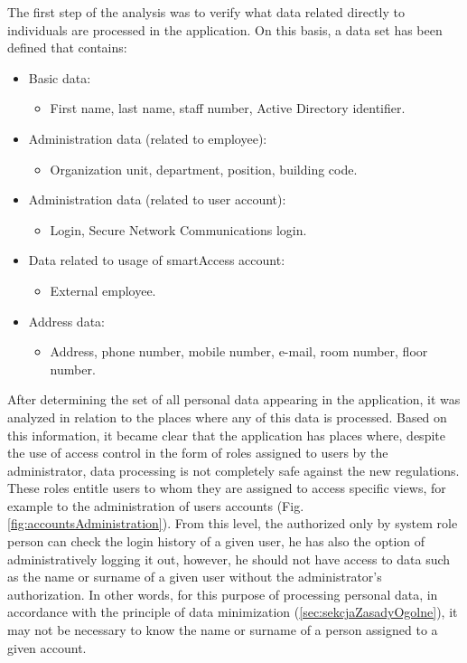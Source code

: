 \documentclass[en, noamssymb]{mgr}
\begin{document}
The first step of the analysis was to verify what data related directly to individuals are processed in the application. On this basis, a data set has been defined that contains:

\begin{itemize}

\item Basic data:

\begin{itemize}
\item First name, last name, staff number, Active Directory identifier.
\end{itemize}

\item Administration data (related to employee):

\begin{itemize}
\item Organization unit, department, position, building code.
\end{itemize}

\item Administration data (related to user account):

\begin{itemize}
\item Login, Secure Network Communications login.
\end{itemize}

\item Data related to usage of smartAccess account:

\begin{itemize}
\item External employee.
\end{itemize}

\item Address data:

\begin{itemize}
\item Address, phone number, mobile number, e-mail, room number, floor number.
\end{itemize}

\end{itemize}

After determining the set of all personal data appearing in the application, it was analyzed in relation to the places where any of this data is processed. Based on this information, it became clear that the application has places where, despite the use of access control in the form of roles assigned to users by the administrator, data processing is not completely safe against the new regulations. These roles entitle users to whom they are assigned to access specific views, for example to the administration of users accounts (Fig. \ref{fig:accountsAdministration}). From this level, the authorized only by system role person can check the login history of a given user, he has also the option of administratively logging it out, however, he should not have access to data such as the name or surname of a given user without the administrator's authorization. In other words, for this purpose of processing personal data, in accordance with the principle of data minimization (\ref{sec:sekcjaZasadyOgolne}), it may not be necessary to know the name or surname of a person assigned to a given account.
\end{document}
